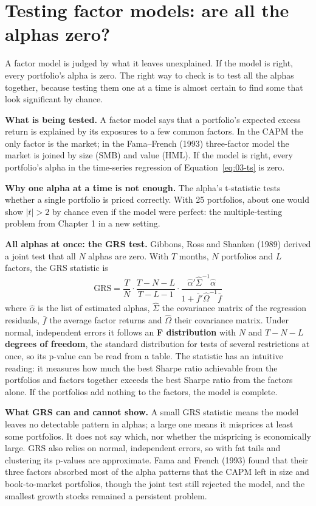 \section{Testing factor models: are all the alphas zero?}
\label{sec:03-grs}

A factor model is judged by what it leaves unexplained. If the model is right,
every portfolio's alpha is zero. The right way to check is to test all the
alphas together, because testing them one at a time is almost certain to find
some that look significant by chance.

\textbf{What is being tested.} A factor model says that a portfolio's expected
excess return is explained by its exposures to a few common factors. In the
CAPM the only factor is the market; in the Fama--French (1993) three-factor
model the market is joined by size (SMB) and value (HML). If the model is
right, every portfolio's alpha in the time-series regression of
Equation~\eqref{eq:03-ts} is zero.

\textbf{Why one alpha at a time is not enough.} The alpha's t-statistic tests
whether a single portfolio is priced correctly. With 25 portfolios, about one
would show $|t| > 2$ by chance even if the model were perfect: the
multiple-testing problem from Chapter 1 in a new setting.

\textbf{All alphas at once: the GRS test.} Gibbons, Ross and Shanken (1989)
derived a joint test that all $N$ alphas are zero. With $T$ months, $N$
portfolios and $L$ factors, the GRS statistic is
\begin{equation}
  \mathrm{GRS} = \frac{T}{N}\cdot\frac{T-N-L}{T-L-1}\cdot\frac{\hat\alpha'\hat\Sigma^{-1}\hat\alpha}{1+\bar f'\hat\Omega^{-1}\bar f}
  \label{eq:03-grs}
\end{equation}
where $\hat\alpha$ is the list of estimated alphas, $\hat\Sigma$ the covariance
matrix of the regression residuals, $\bar f$ the average factor returns and
$\hat\Omega$ their covariance matrix. Under normal, independent errors it
follows an \textbf{F distribution} with $N$ and $T - N - L$ \textbf{degrees of
freedom}, the standard distribution for tests of several restrictions at once,
so its p-value can be read from a table. The statistic has an intuitive
reading: it measures how much the best Sharpe ratio achievable from the
portfolios and factors together exceeds the best Sharpe ratio from the factors
alone. If the portfolios add nothing to the factors, the model is complete.

\textbf{What GRS can and cannot show.} A small GRS statistic means the model
leaves no detectable pattern in alphas; a large one means it misprices at least
some portfolios. It does not say which, nor whether the mispricing is
economically large. GRS also relies on normal, independent errors, so with fat
tails and clustering its p-values are approximate. Fama and French (1993) found
that their three factors absorbed most of the alpha patterns that the CAPM left
in size and book-to-market portfolios, though the joint test still rejected the
model, and the smallest growth stocks remained a persistent problem.

